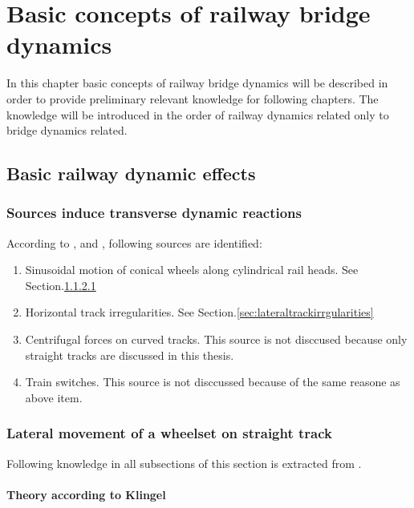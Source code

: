 
\chapter{Basic concepts of railway bridge dynamics}

In this chapter basic concepts of railway bridge dynamics will be described in order to provide preliminary relevant knowledge for following chapters. The knowledge will be introduced in the order of railway dynamics related only to bridge dynamics related. 

\section{Basic railway dynamic effects}

\subsection{Sources induce transverse dynamic reactions}
According to \citet{da2007dynamic}, \citet{fryba1996dynamics} and \citet{EC12}, following sources are identified:

\begin{enumerate} [-]
    \item Sinusoidal motion of conical wheels along cylindrical rail heads. See Section.\ref{sec:klingel}
    \item Horizontal track irregularities. See Section.\ref{sec:lateraltrackirrgularities}
    \item Centrifugal forces on curved tracks. This source is not disccused because only straight tracks are discussed in this thesis.
    \item Train switches. This source is not disccussed because of the same reasone as above item.
\end{enumerate}

\subsection{Lateral movement of a wheelset on straight track}

Following knowledge in all subsections of this section is extracted from \citet{esveld2001modern}. 

\subsubsection{Theory according to Klingel}\label{sec:klingel}

